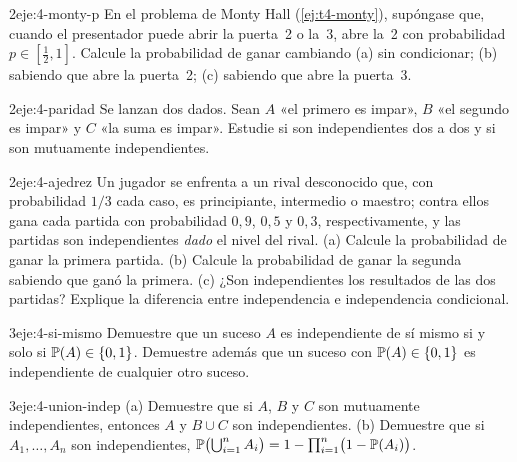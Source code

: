 \begin{ejercicio}{2}{eje:4-monty-p}
En el problema de Monty Hall (\cref{ej:t4-monty}), supóngase que, cuando el presentador puede abrir la puerta~2 o la~3, abre la~2 con probabilidad $p\in[\tfrac12,1]$. Calcule la probabilidad de ganar cambiando (a) sin condicionar; (b) sabiendo que abre la puerta~2; (c) sabiendo que abre la puerta~3.
\end{ejercicio}

\begin{ejercicio}{2}{eje:4-paridad}
Se lanzan dos dados. Sean $A$ «el primero es impar», $B$ «el segundo es impar» y $C$ «la suma es impar». Estudie si son independientes dos a dos y si son mutuamente independientes.
\end{ejercicio}

\begin{ejercicio}{2}{eje:4-ajedrez}
Un jugador se enfrenta a un rival desconocido que, con probabilidad $1/3$ cada caso, es principiante, intermedio o maestro; contra ellos gana cada partida con probabilidad $0{,}9$, $0{,}5$ y $0{,}3$, respectivamente, y las partidas son independientes \emph{dado} el nivel del rival. (a) Calcule la probabilidad de ganar la primera partida. (b) Calcule la probabilidad de ganar la segunda sabiendo que ganó la primera. (c) ¿Son independientes los resultados de las dos partidas? Explique la diferencia entre independencia e independencia condicional.
\end{ejercicio}

\begin{ejercicio}{3}{eje:4-si-mismo}
Demuestre que un suceso $A$ es independiente de sí mismo si y solo si $\mathbb{P}(A)\in\{0,1\}$. Demuestre además que un suceso con $\mathbb{P}(A)\in\{0,1\}$ es independiente de cualquier otro suceso.
\end{ejercicio}

\begin{ejercicio}{3}{eje:4-union-indep}
(a) Demuestre que si $A$, $B$ y $C$ son mutuamente independientes, entonces $A$ y $B\cup C$ son independientes. (b) Demuestre que si $A_1,\dots,A_n$ son independientes, $\mathbb{P}\bigl(\bigcup_{i=1}^{n}A_i\bigr)=1-\prod_{i=1}^{n}\bigl(1-\mathbb{P}(A_i)\bigr)$.
\end{ejercicio}

